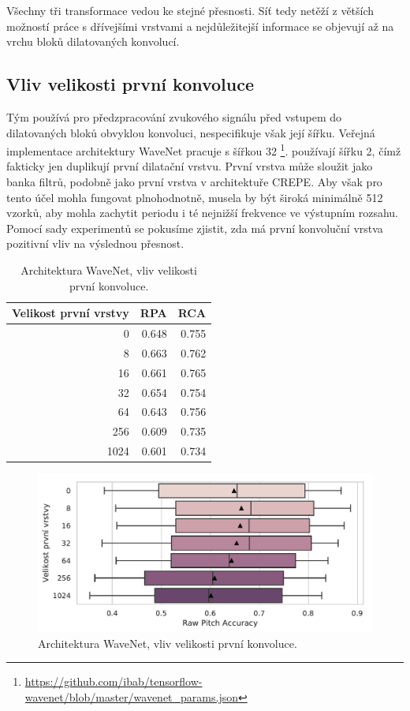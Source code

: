 Všechny tři transformace vedou ke stejné přesnosti. Síť tedy netěží z větších možností práce s dřívejšími vrstvami a nejdůležitejší informace se objevují až na vrchu bloků dilatovaných konvolucí.

\subsection{Vliv velikosti první konvoluce}

Tým \cite{Oord2016} používá pro předzpracování zvukového signálu před vstupem do dilatovaných bloků obvyklou konvoluci, nespecifikuje však její šířku. Veřejná implementace architektury WaveNet pracuje s šířkou 32 \footnote{\url{https://github.com/ibab/tensorflow-wavenet/blob/master/wavenet_params.json}}. \cite{Martak2018} používají šířku 2, čímž fakticky jen duplikují první dilatační vrstvu. První vrstva může sloužit jako banka filtrů, podobně jako první vrstva v architektuře CREPE. Aby však pro tento účel mohla fungovat plnohodnotně, musela by být široká minimálně 512 vzorků, aby mohla zachytit periodu i té nejnižší frekvence ve výstupním rozsahu. Pomocí sady experimentů se pokusíme zjistit, zda má první konvoluční vrstva pozitivní vliv na výslednou přesnost.


\begin{table}[h!]
\centering
    \begin{tabular}{rrr}
    \toprule
    Velikost první vrstvy &   RPA &   RCA \\
    \midrule
                        0 & 0.648 & 0.755 \\
                        8 & 0.663 & 0.762 \\
                    16 & 0.661 & 0.765 \\
                    32 & 0.654 & 0.754 \\
                    64 & 0.643 & 0.756 \\
                    256 & 0.609 & 0.735 \\
                    1024 & 0.601 & 0.734 \\
    \bottomrule
    \end{tabular}
\caption{Architektura WaveNet, vliv velikosti první konvoluce.}\label{tab:wavenet_first_layer}
\end{table}

\begin{figure}[h]\centering
    \includegraphics[scale=0.6]{../img/figures/wavenet_first_layer}
\caption{Architektura WaveNet, vliv velikosti první konvoluce.}\label{obr:wavenet_first_layer}
\end{figure}

